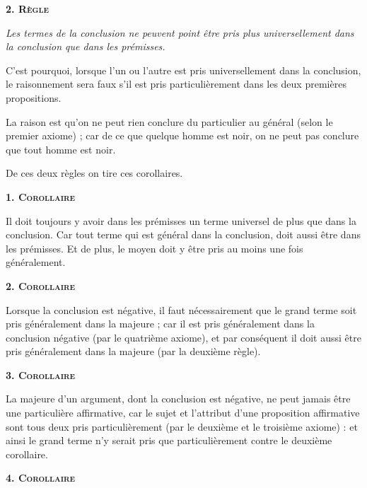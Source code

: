 \bigbreak
\bigbreak

\begin{center}{\bfseries\scshape\large 2. Règle}\end{center}

	\emph{Les termes de la conclusion ne peuvent point être pris plus universellement dans la conclusion que dans les prémisses.}

C'est pourquoi, lorsque l'un ou l'autre est pris universellement dans la conclusion, le raisonnement sera faux s'il est pris particulièrement dans les deux premières propositions.

La raison est qu'on ne peut rien conclure du particulier au général (selon le premier axiome) ; car de ce que quelque homme est noir, on ne peut pas conclure que tout homme est noir.

De ces deux règles on tire ces corollaires.

\begin{center}{\bfseries\scshape 1. Corollaire}\end{center}

	Il doit toujours y avoir dans les prémisses un terme universel de plus que dans la conclusion. Car tout terme qui est général dans la conclusion, doit aussi être dans les prémisses. Et de plus, le moyen doit y être pris au moins une fois généralement.

\begin{center}{\bfseries\scshape 2. Corollaire}\end{center}

	Lorsque la conclusion est négative, il faut nécessairement que le grand terme soit pris généralement dans la majeure ; car il est pris généralement dans la conclusion négative (par le quatrième axiome), et par conséquent il doit aussi être pris généralement dans la majeure (par la deuxième règle).

\begin{center}{\bfseries\scshape 3. Corollaire}\end{center}

	La majeure d'un argument, dont la conclusion est négative, ne peut jamais être une particulière affirmative, car le sujet et l'attribut d'une proposition affirmative sont tous deux pris particulièrement (par le deuxième et le troisième axiome) : et ainsi le grand terme n'y serait pris que particulièrement contre le deuxième corollaire.

\bigbreak

\begin{center}{\bfseries\scshape 4. Corollaire}\end{center}

